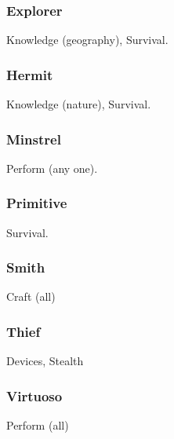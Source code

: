 \subsubsection{Explorer}
 Knowledge (geography), Survival.

\subsubsection{Hermit}
 Knowledge (nature), Survival.

\subsubsection{Minstrel}
 Perform (any one).

\subsubsection{Primitive}
 Survival.

\subsubsection{Smith}
 Craft (all)

\subsubsection{Thief}
 Devices, Stealth

\subsubsection{Virtuoso}
 Perform (all)

